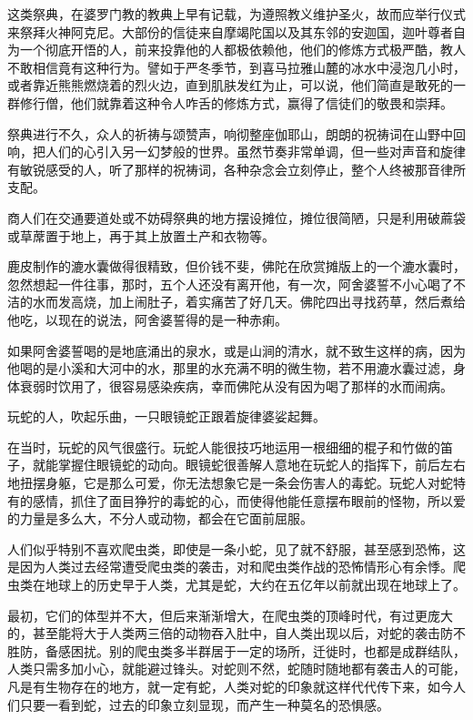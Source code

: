 \documentclass[twoside,openany]{book}
\begin{document}
这类祭典，在婆罗门教的教典上早有记载，为遵照教义维护圣火，故而应举行仪式来祭拜火神阿克尼。大部份的信徒来自摩竭陀国以及其东邻的安迦国，迦叶尊者自为一个彻底开悟的人，前来投靠他的人都极依赖他，他们的修炼方式极严酷，教人不敢相信竟有这种行为。譬如于严冬季节，到喜马拉雅山麓的冰水中浸泡几小时，或者靠近熊熊燃烧着的烈火边，直到肌肤发红为止，可以说，他们简直是敢死的一群修行僧，他们就靠着这种令人咋舌的修炼方式，赢得了信徒们的敬畏和崇拜。

祭典进行不久，众人的祈祷与颂赞声，响彻整座伽耶山，朗朗的祝祷词在山野中回响，把人们的心引入另一幻梦般的世界。虽然节奏非常单调，但一些对声音和旋律有敏锐感受的人，听了那样的祝祷词，各种杂念会立刻停止，整个人终被那音律所支配。

商人们在交通要道处或不妨碍祭典的地方摆设摊位，摊位很简陋，只是利用破蔴袋或草蓆置于地上，再于其上放置土产和衣物等。

鹿皮制作的漉水囊做得很精致，但价钱不斐，佛陀在欣赏摊版上的一个漉水囊时，忽然想起一件往事，那时，五个人还没有离开他，有一次，阿舍婆誓不小心喝了不洁的水而发高烧，加上闹肚子，着实痛苦了好几天。佛陀四出寻找药草，然后煮给他吃，以现在的说法，阿舍婆誓得的是一种赤痢。

如果阿舍婆誓喝的是地底涌出的泉水，或是山涧的清水，就不致生这样的病，因为他喝的是小溪和大河中的水，那里的水充满不明的微生物，若不用漉水囊过滤，身体衰弱时饮用了，很容易感染疾病，幸而佛陀从没有因为喝了那样的水而闹病。

玩蛇的人，吹起乐曲，一只眼镜蛇正跟着旋律婆娑起舞。

在当时，玩蛇的风气很盛行。玩蛇人能很技巧地运用一根细细的棍子和竹做的笛子，就能掌握住眼镜蛇的动向。眼镜蛇很善解人意地在玩蛇人的指挥下，前后左右地扭摆身躯，它是那么可爱，你无法想象它是一条会伤害人的毒蛇。玩蛇人对蛇特有的感情，抓住了面目狰狞的毒蛇的心，而使得他能任意摆布眼前的怪物，所以爱的力量是多么大，不分人或动物，都会在它面前屈服。

人们似乎特别不喜欢爬虫类，即使是一条小蛇，见了就不舒服，甚至感到恐怖，这是因为人类过去经常遭受爬虫类的袭击，对和爬虫类作战的恐怖情形心有余悸。爬虫类在地球上的历史早于人类，尤其是蛇，大约在五亿年以前就出现在地球上了。

最初，它们的体型并不大，但后来渐渐增大，在爬虫类的顶峰时代，有过更庞大的，甚至能将大于人类两三倍的动物吞入肚中，自人类出现以后，对蛇的袭击防不胜防，备感困扰。别的爬虫类多半群居于一定的场所，迁徙时，也都是成群结队，人类只需多加小心，就能避过锋头。对蛇则不然，蛇随时随地都有袭击人的可能，凡是有生物存在的地方，就一定有蛇，人类对蛇的印象就这样代代传下来，如今人们只要一看到蛇，过去的印象立刻显现，而产生一种莫名的恐惧感。
\end{document}
